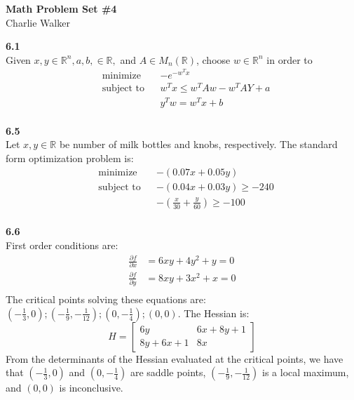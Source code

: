 \documentclass[letterpaper,12pt]{article}
\theoremstyle{definition}
\begin{document}
\begin{flushleft}
  \textbf{\large{Math Problem Set \#4}} \\
  Charlie Walker
\end{flushleft}

\vspace{5mm}

\noindent\textbf{6.1}\\
Given $x,y \in \mathbb{R}^n, a, b, \in \mathbb{R},$ and $A \in M_n(\mathbb{R})$, choose $w \in \mathbb{R}^n$ in order to
\begin{align*}
& \text{minimize} & & -e^{-w^Tx} \\
& \text{subject to} & & w^Tx \leq w^TAw - w^TAY + a\\
& & & y^Tw = w^Tx + b
\end{align*}\\

\noindent\textbf{6.5}\\
Let $x,y \in \mathbb{R}$ be number of milk bottles and knobs, respectively. The standard form optimization problem is:
\begin{align*}
& \text{minimize} & & -(0.07x + 0.05y) \\
& \text{subject to} & & -(0.04x + 0.03y) \geq -240\\
& & & -(\frac{x}{30} + \frac{y}{60}) \geq -100
\end{align*}\\

\noindent\textbf{6.6}\\
First order conditions are:
\begin{align*}
\frac{\partial f}{\partial x} &= 6xy + 4y^2 + y = 0\\
\frac{\partial f}{\partial y} &= 8xy + 3x^2 + x = 0\\
\end{align*}
The critical points solving these equations are: $(-\frac{1}{3}, 0); (-\frac{1}{9}, -\frac{1}{12}); (0, -\frac{1}{4}); (0,0)$. The Hessian is:
\begin{equation*}
H = \begin{bmatrix}
6y & 6x + 8y + 1 \\
8y + 6x + 1 & 8x 
\end{bmatrix}
\end{equation*}
From the determinants of the Hessian evaluated at the critical points, we have that $(-\frac{1}{3}, 0)$ and $(0, -\frac{1}{4})$ are saddle points, $(-\frac{1}{9}, -\frac{1}{12})$ is a local maximum, and $(0,0)$ is inconclusive.\\
\end{document}
